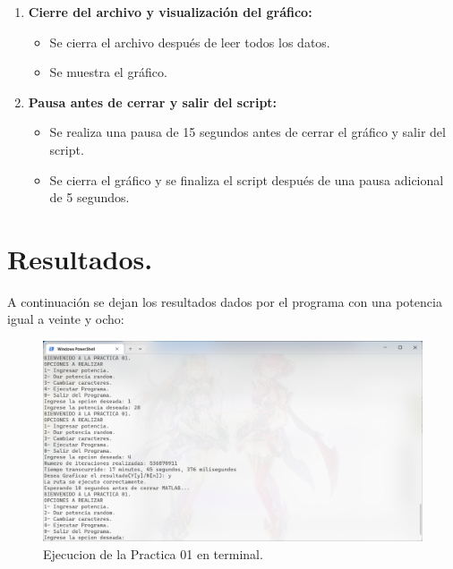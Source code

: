\documentclass{article}
\begin{document}
\begin{enumerate}
                \item \textbf{Cierre del archivo y visualización del gráfico:}
                \begin{itemize}
                    \item Se cierra el archivo después de leer todos los datos.
                    \item Se muestra el gráfico.
                \end{itemize}

                \item \textbf{Pausa antes de cerrar y salir del script:}
                \begin{itemize}
                    \item Se realiza una pausa de 15 segundos antes de cerrar el gráfico y salir del script.
                    \item Se cierra el gráfico y se finaliza el script después de una pausa adicional de 5 segundos.
                \end{itemize}
            \end{enumerate}

\section{Resultados.}
A continuación se dejan los resultados dados por el
programa con una potencia igual a veinte y ocho:
\begin{figure}[H]
    \centering
    \includegraphics[width=1\linewidth]{Terminal.png}
    \caption{Ejecucion de la Practica 01 en terminal.}\label{terminal}
\end{figure}
\end{document}

